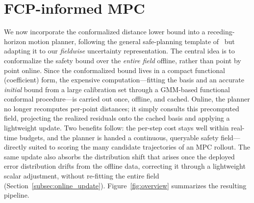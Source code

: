 \documentclass[lettersize,journal]{IEEEtran}
\begin{document}
\section{FCP-informed MPC}
\label{sec:cp_mpc}
We now incorporate the conformalized distance lower bound into a receding-horizon motion planner, following the general safe-planning template of~\cite{lindemann2023safeplanning} but adapting it to our \emph{fieldwise} uncertainty representation.
The central idea is to conformalize the safety bound over the \emph{entire field} offline, rather than point by point online.
Since the conformalized bound lives in a compact functional (coefficient) form, the expensive computation---fitting the basis and an accurate \emph{initial} bound from a large calibration set through a GMM-based functional conformal procedure---is carried out once, offline, and cached.
Online, the planner no longer recomputes per-point distances; it simply consults this precomputed field, projecting the realized residuals onto the cached basis and applying a lightweight update.
Two benefits follow: the per-step cost stays well within real-time budgets, and the planner is handed a continuous, queryable safety field---directly suited to scoring the many candidate trajectories of an MPC rollout.
The same update also absorbs the distribution shift that arises once the deployed error distribution drifts from the offline data, correcting it through a lightweight scalar adjustment, without re-fitting the entire field (Section~\ref{subsec:online_update}).
Figure~\ref{fig:overview} summarizes the resulting pipeline.
\end{document}
